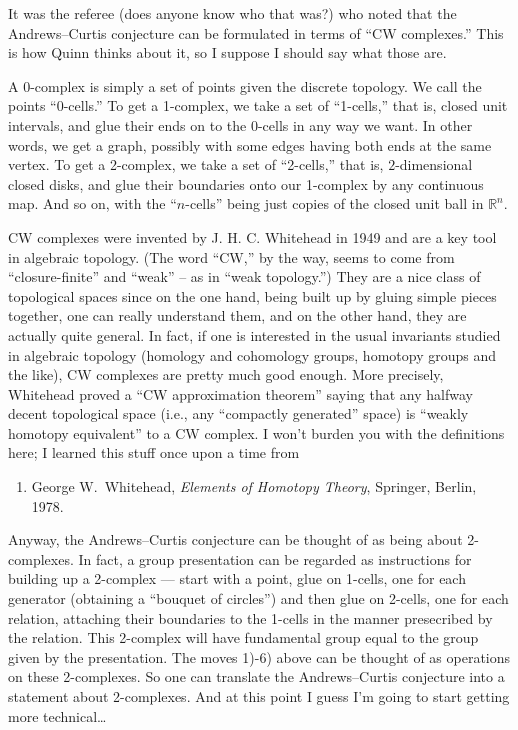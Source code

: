 \documentclass[12pt]{article}
\def\tightlist{}
\begin{document}
It was the referee (does anyone know who that was?) who noted that the
Andrews--Curtis conjecture can be formulated in terms of ``CW
complexes.'' This is how Quinn thinks about it, so I suppose I should
say what those are.

A 0-complex is simply a set of points given the discrete topology. We
call the points ``0-cells.'' To get a 1-complex, we take a set of
``1-cells,'' that is, closed unit intervals, and glue their ends on to
the 0-cells in any way we want. In other words, we get a graph, possibly
with some edges having both ends at the same vertex. To get a 2-complex,
we take a set of ``2-cells,'' that is, \(2\)-dimensional closed disks,
and glue their boundaries onto our 1-complex by any continuous map. And
so on, with the ``\(n\)-cells'' being just copies of the closed unit
ball in \(\mathbb{R}^n\).

CW complexes were invented by J. H. C. Whitehead in 1949 and are a key
tool in algebraic topology. (The word ``CW,'' by the way, seems to come
from ``closure-finite'' and ``weak'' -- as in ``weak topology.'') They
are a nice class of topological spaces since on the one hand, being
built up by gluing simple pieces together, one can really understand
them, and on the other hand, they are actually quite general. In fact,
if one is interested in the usual invariants studied in algebraic
topology (homology and cohomology groups, homotopy groups and the like),
CW complexes are pretty much good enough. More precisely, Whitehead
proved a ``CW approximation theorem'' saying that any halfway decent
topological space (i.e., any ``compactly generated'' space) is ``weakly
homotopy equivalent'' to a CW complex. I won't burden you with the
definitions here; I learned this stuff once upon a time from

\begin{enumerate}
\def\labelenumi{\arabic{enumi})}
\setcounter{enumi}{3}
\tightlist
\item
   George W.\ Whitehead,  \emph{Elements of Homotopy Theory},
  Springer, Berlin, 1978. 
\end{enumerate}

Anyway, the Andrews--Curtis conjecture can be thought of as being about
2-complexes. In fact, a group presentation can be regarded as
instructions for building up a 2-complex --- start with a point, glue on
1-cells, one for each generator (obtaining a ``bouquet of circles'') and
then glue on 2-cells, one for each relation, attaching their boundaries
to the 1-cells in the manner presecribed by the relation. This 2-complex
will have fundamental group equal to the group given by the
presentation. The moves 1)-6) above can be thought of as operations on
these 2-complexes. So one can translate the Andrews--Curtis conjecture
into a statement about 2-complexes. And at this point I guess I'm going
to start getting more technical\ldots{}
\end{document}
